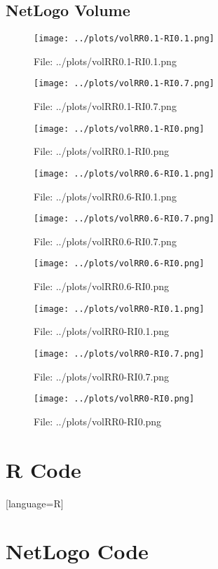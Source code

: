 \documentclass[a4paper, 11pt]{report}
\let\Oldsection\section
\renewcommand{\section}{\FloatBarrier\Oldsection}
\let\Oldsubsection\subsection
\renewcommand{\subsection}{\FloatBarrier\Oldsubsection}
\begin{document}
\subsection{NetLogo Volume}
\begin{figure}[h!] \caption{File: ../plots/volRR0.1-RI0.1.png} \texttt{[image: ../plots/volRR0.1-RI0.1.png]} \end{figure}
\begin{figure}[h!] \caption{File: ../plots/volRR0.1-RI0.7.png} \texttt{[image: ../plots/volRR0.1-RI0.7.png]} \end{figure}
\begin{figure}[h!] \caption{File: ../plots/volRR0.1-RI0.png} \texttt{[image: ../plots/volRR0.1-RI0.png]} \end{figure}
\begin{figure}[h!] \caption{File: ../plots/volRR0.6-RI0.1.png} \texttt{[image: ../plots/volRR0.6-RI0.1.png]} \end{figure}
\begin{figure}[h!] \caption{File: ../plots/volRR0.6-RI0.7.png} \texttt{[image: ../plots/volRR0.6-RI0.7.png]} \end{figure}
\begin{figure}[h!] \caption{File: ../plots/volRR0.6-RI0.png} \texttt{[image: ../plots/volRR0.6-RI0.png]} \end{figure}
\begin{figure}[h!] \caption{File: ../plots/volRR0-RI0.1.png} \texttt{[image: ../plots/volRR0-RI0.1.png]} \end{figure}
\begin{figure}[h!] \caption{File: ../plots/volRR0-RI0.7.png} \texttt{[image: ../plots/volRR0-RI0.7.png]} \end{figure}
\begin{figure}[h!] \caption{File: ../plots/volRR0-RI0.png} \texttt{[image: ../plots/volRR0-RI0.png]} \end{figure}




\section{R Code}[language=R]
\label{append:r}

\section{NetLogo Code}
\label{append:netlogo}

	
\end{document}

